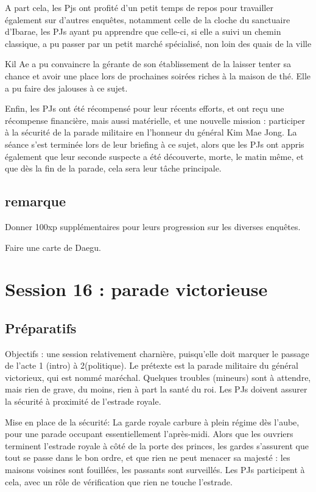 \documentclass[10pt,a4paper]{book}
\begin{document}
A part cela, les Pjs ont profité d'un petit temps de repos pour travailler également sur d'autres enquêtes, notamment celle de la cloche du sanctuaire d'Ibarae, les PJs ayant pu apprendre que celle-ci, si elle a suivi un chemin classique, a pu passer par un petit marché spécialisé, non loin des quais de la ville

Kil Ae a pu convaincre la gérante de son établissement de la laisser tenter sa chance et avoir une place lors de prochaines soirées riches à la maison de thé. Elle a pu faire des jalouses à ce sujet.

Enfin, les PJs ont été récompensé pour leur récents efforts, et ont reçu une récompense financière, mais aussi matérielle, et une nouvelle mission : participer à la sécurité de la parade militaire en l'honneur du général Kim Mae Jong. La séance s'est terminée lors de leur briefing à ce sujet, alors que les PJs ont appris également que leur seconde suspecte a été découverte, morte, le matin même, et que dès la fin de la parade, cela sera leur tâche principale.
\subsection{remarque}
Donner 100xp supplémentaires pour leurs progression sur les diverses enquêtes.

Faire une carte de Daegu.

\section{Session 16 : parade victorieuse}
\subsection{Préparatifs}
Objectifs : une session relativement charnière, puisqu'elle doit marquer le passage de l'acte 1 (intro) à 2(politique). Le prétexte est la parade militaire du général victorieux, qui est nommé maréchal. Quelques troubles (mineurs) sont à attendre, mais rien de grave, du moins, rien à part la santé du roi.
Les PJs doivent assurer la sécurité à proximité de l'estrade royale.

Mise en place de la sécurité:
La garde royale carbure à plein régime dès l'aube, pour une parade occupant essentiellement l'après-midi. Alors que les ouvriers terminent l'estrade royale à côté de la porte des princes, les gardes s'assurent que tout se passe dans le bon ordre, et que rien ne peut menacer sa majesté : les maisons voisines sont fouillées, les passants sont surveillés. Les PJs participent à cela, avec un rôle de vérification que rien ne touche l'estrade.
\end{document}
